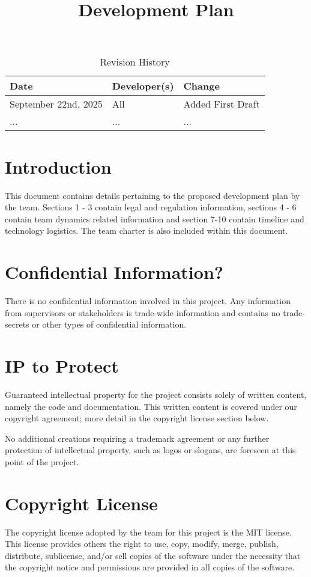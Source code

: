 \documentclass{article}
\title{Development Plan\\\progname}
\author{\authname}
\date{}
\begin{document}
\maketitle

\begin{table}[hp]
\caption{Revision History} \label{TblRevisionHistory}
\begin{tabularx}{\textwidth}{llX}
\toprule
\textbf{Date} & \textbf{Developer(s)} & \textbf{Change}\\
\midrule
September 22nd, 2025 & All & Added First Draft \\
... & ... & ...\\
\bottomrule
\end{tabularx}
\end{table}

\newpage{}

\section{Introduction}
This document contains details pertaining to the proposed development plan by the team.
Sections 1 - 3 contain legal and regulation information, sections 4 - 6 contain team dynamics related information and 
section 7-10 contain timeline and technology logistics. The team charter is also included within this document. \\


\section{Confidential Information?}
There is no confidential information involved in this project. Any information
from supervisors or stakeholders is trade-wide information and contains
no trade-secrets or other types of confidential information.

\section{IP to Protect}
Guaranteed intellectual property for the project consists solely of written
content, namely the code and documentation. This written content is covered
under our copyright agreement; more detail in the copyright license section
below.

No additional creations requiring a trademark agreement or any further
protection of intellectual property, such as logos or slogans, are foreseen
at this point of the project.

\section{Copyright License}
The copyright license adopted by the team for this project is the MIT license.
This license provides others the right to use, copy, modify, merge, publish,
distribute, sublicense, and/or sell copies of the software under the necessity
that the copyright notice and permissions are provided in all copies of the software.
\end{document}

